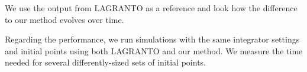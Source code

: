 We use the output from LAGRANTO as a reference and look how the difference to our method evolves over time.

Regarding the performance, we run simulations with the same integrator settings and initial points using both LAGRANTO and our method. We measure the time needed for several differently-sized sets of initial points.




